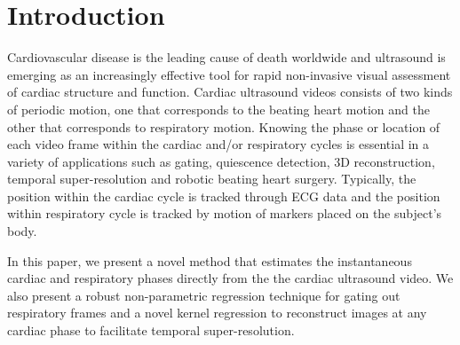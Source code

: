 \documentclass[runningheads,a4paper]{llncs}
\begin{document}
\section{Introduction}
\label{sec:intro}
%
Cardiovascular disease is the leading cause of death worldwide and ultrasound is emerging as an increasingly effective tool for rapid non-invasive visual assessment of cardiac structure and function. Cardiac ultrasound videos consists of two kinds of periodic motion, one that corresponds to the beating heart motion and the other that corresponds to respiratory motion. Knowing the phase or location of each video frame within the cardiac and/or respiratory cycles is essential in a variety of applications such as gating\cite{VonBirgelen1997}, quiescence detection\cite{Wick2013}, 3D reconstruction\cite{Wachinger2012}, temporal super-resolution\cite{Cherin2006} and robotic beating heart surgery\cite{Kurz2015}. Typically, the position within the cardiac cycle is tracked through ECG data and the position within respiratory cycle is tracked by motion of markers placed on the subject's body\cite{Khamene2004}. 

	In this paper, we present a novel method that estimates the instantaneous cardiac and respiratory phases directly from the the cardiac ultrasound video. We also present a robust non-parametric regression technique for gating out respiratory frames and a novel kernel regression to reconstruct images at any cardiac phase to facilitate temporal super-resolution.	
%
\vspace{-0.3cm}
\end{document}
